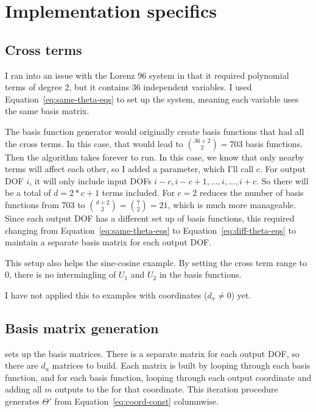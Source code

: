 \documentclass{article}
\def\lstinline#1{}%
\begin{document}
\section{Implementation specifics}

\subsection{Cross terms}
I ran into an issue with the Lorenz 96 system in that it required polynomial
terms of degree 2, but it contains 36 independent variables. I used
Equation~\ref{eq:same-theta-eqs} to set up the system, meaning each variable
uses the same basis matrix.

The basis function generator would originally create basis functions that had
all the cross terms. In this case, that would lead to $\binom{36 + 2}{2} = 703$
basis functions. Then the algorithm takes forever to run. In this case, we know
that only nearby terms will affect each other, so I added a
\lstinline{cross_term_range} parameter, which I'll call $c$. For output DOF $i$,
it will only include input DOFs $i-c,i-c+1,\hdots,i,\hdots,i+c$. So there will
be a total of $d = 2*c+1$ terms included. For $c=2$ reduces the number of basis
functions from 703 to $\binom{d+2}{2} = \binom{7}{2} = 21$, which is much more
manageable. Since each output DOF has a different set up of basis functions,
this required changing from Equation~\ref{eq:same-theta-eqs} to
Equation~\ref{eq:diff-theta-eqs} to maintain a separate basis matrix for each
output DOF.

This setup also helps the sine-cosine example. By setting the cross term range
to 0, there is no intermingling of $U_1$ and $U_2$ in the basis functions.

I have not applied this to examples with coordinates ($d_x \ne 0$) yet.

\subsection{Basis matrix generation}

\lstinline{SINDyBasisAddVariables} sets up the basis matrices. There is a
separate matrix for each output DOF, so there are $d_u$ matrices to build.
Each matrix is built by looping through each basis function, and for each basis function,
looping through each output coordinate and adding all $m$ outputs to the for that coordinate.
This iteration procedure generates $\Theta'$ from Equation~\ref{eq:coord-const} columnwise.




\end{document}
